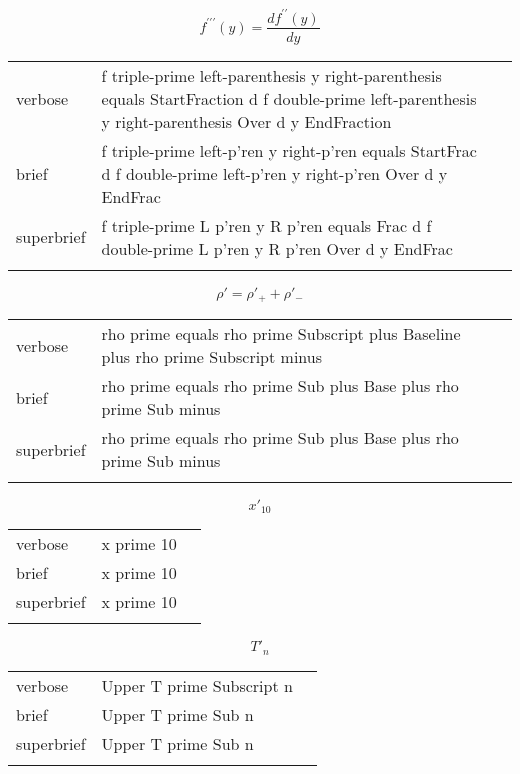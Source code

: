 \E \[f^{\prime\prime\prime}(y)=\frac{df^{\prime\prime}(y)}{dy}\]
\begin{longtable}[c]{@{}lll@{}}
\toprule\addlinespace
verbose & f triple-prime left-parenthesis y right-parenthesis equals
StartFraction d f double-prime left-parenthesis y right-parenthesis Over
d y EndFraction &

\\\addlinespace
brief & f triple-prime left-p'ren y right-p'ren equals StartFrac d f
double-prime left-p'ren y right-p'ren Over d y EndFrac &

\\\addlinespace
superbrief & f triple-prime L p'ren y R p'ren equals Frac d f
double-prime L p'ren y R p'ren Over d y EndFrac &

\\\addlinespace
\bottomrule
\end{longtable}


\R
\E \[\rho' = \rho'_+ + \rho'_-\]
\begin{longtable}[c]{@{}lll@{}}
\toprule\addlinespace
verbose & rho prime equals rho prime Subscript plus Baseline plus rho
prime Subscript minus &

\\\addlinespace
brief & rho prime equals rho prime Sub plus Base plus rho prime Sub
minus &

\\\addlinespace
superbrief & rho prime equals rho prime Sub plus Base plus rho prime Sub
minus &

\\\addlinespace
\bottomrule
\end{longtable}


\E \[x'_{10}\]
\begin{longtable}[c]{@{}lll@{}}
\toprule\addlinespace
verbose & x prime 10 &

\\\addlinespace
brief & x prime 10 &

\\\addlinespace
superbrief & x prime 10 &

\\\addlinespace
\bottomrule
\end{longtable}


\E \[T'_n\]
\begin{longtable}[c]{@{}lll@{}}
\toprule\addlinespace
verbose & Upper T prime Subscript n &

\\\addlinespace
brief & Upper T prime Sub n &

\\\addlinespace
superbrief & Upper T prime Sub n &

\\\addlinespace
\bottomrule
\end{longtable}


